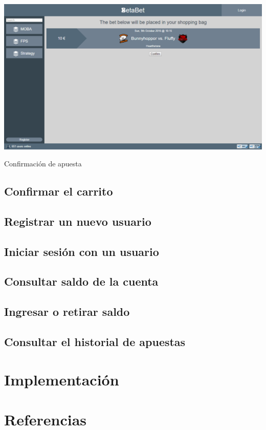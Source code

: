 \documentclass{article}
\begin{document}
\begin{minipage}{\linewidth}
    \centering
    \captionsetup{type=figure}
    \includegraphics[width=.9\linewidth]{fig6}
    \caption{Confirmación de apuesta}
    \label{fig:fig6}
\end{minipage}
\newpage
\subsection{Confirmar el carrito}
\subsection{Registrar un nuevo usuario}
\subsection{Iniciar sesión con un usuario}
\subsection{Consultar saldo de la cuenta}
\subsection{Ingresar o retirar saldo}
\subsection{Consultar el historial de apuestas}
\section{Implementación}
\section{Referencias}
\end{document}
